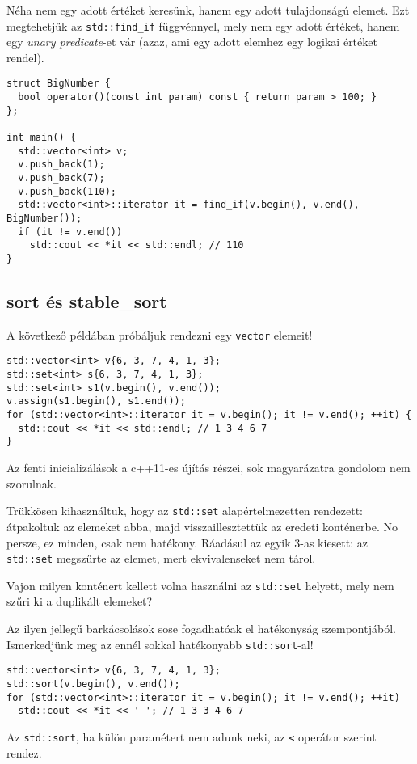 \documentclass[../cpp_book/cpp_book.tex]{subfiles}
\begin{document}
	\medskip
	Néha nem egy adott értéket keresünk, hanem egy adott tulajdonságú elemet. Ezt megtehetjük az \texttt{std::find\_if} függvénnyel, mely nem egy adott értéket, hanem egy \textit{unary predicate}-et vár (azaz, ami egy adott elemhez egy logikai értéket rendel).
	\begin{lstlisting}
struct BigNumber {
  bool operator()(const int param) const { return param > 100; }
};

int main() {
  std::vector<int> v;
  v.push_back(1);
  v.push_back(7);
  v.push_back(110);
  std::vector<int>::iterator it = find_if(v.begin(), v.end(), BigNumber());
  if (it != v.end())
    std::cout << *it << std::endl; // 110
}
	\end{lstlisting}
	\subsection{sort és stable\_sort}
	A következő példában próbáljuk rendezni egy \texttt{vector} elemeit!
	\begin{lstlisting}
std::vector<int> v{6, 3, 7, 4, 1, 3};
std::set<int> s{6, 3, 7, 4, 1, 3};
std::set<int> s1(v.begin(), v.end());
v.assign(s1.begin(), s1.end());
for (std::vector<int>::iterator it = v.begin(); it != v.end(); ++it) {
  std::cout << *it << std::endl; // 1 3 4 6 7
}
	\end{lstlisting}
%	
	\begin{note}
		Az fenti inicializálások a c++11-es újítás részei, sok magyarázatra gondolom nem szorulnak.
	\end{note}
	Trükkösen kihasználtuk, hogy az \texttt{std::set} alapértelmezetten rendezett: átpakoltuk az elemeket abba, majd visszaillesztettük az eredeti konténerbe. No persze, ez minden, csak nem hatékony. Ráadásul az egyik 3-as kiesett: az \texttt{std::set} megszűrte az elemet, mert ekvivalenseket nem tárol.
	\begin{note}
		Vajon milyen konténert kellett volna használni az \texttt{std::set} helyett, mely nem szűri ki a duplikált elemeket?
	\end{note}
	Az ilyen jellegű barkácsolások sose fogadhatóak el hatékonyság szempontjából. Ismerkedjünk meg az ennél sokkal hatékonyabb \texttt{std::sort}-al!
	\begin{lstlisting}
std::vector<int> v{6, 3, 7, 4, 1, 3};
std::sort(v.begin(), v.end());
for (std::vector<int>::iterator it = v.begin(); it != v.end(); ++it)
  std::cout << *it << ' '; // 1 3 3 4 6 7
	\end{lstlisting}
	Az \texttt{std::sort}, ha külön paramétert nem adunk neki, az \texttt{<} operátor szerint rendez.
	
\end{document}
